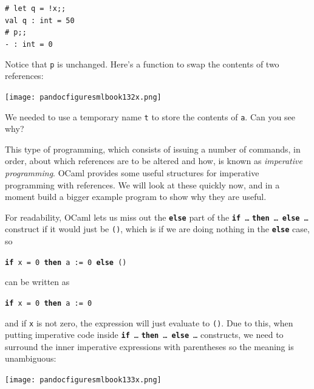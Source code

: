 \documentclass[]{book}
\newcommand{\smspace}{\vspace{4mm}}
\begin{document}
\smspace
\noindent\verb$# let q = !x;;$\\
\noindent\verb!val q : int = 50!\\
\noindent\verb$# p;;$\\
\noindent\verb!- : int = 0!
\smspace

\noindent Notice that \texttt{p} is unchanged. Here's a function to swap the contents of two references:

\medskip
\begin{center}
\noindent\texttt{[image: pandocfiguresmlbook132x.png]}
\end{center}
\medskip

\noindent We needed to use a temporary name \texttt{t} to store the contents of \texttt{a}. Can you see why?

This type of programming, which consists of issuing a number of commands, in order, about which references are to be altered and how, is known as \textit{imperative programming}. OCaml provides some useful structures for imperative programming with references. We will look at these quickly now, and in a moment build a bigger example program to show why they are useful.

For readability, OCaml lets us miss out the \textbf{\texttt{else}} part of the \textbf{\texttt{if}}\ \texttt{\ldots} \textbf{\texttt{then}}\ \texttt{\ldots}\ \textbf{\texttt{else}}\ \texttt{\ldots} construct if it would just be \texttt{()}, which is if we are doing nothing in the \textbf{\texttt{else}} case, so

\smspace
  \textbf{\texttt{if}}\texttt{ x = 0 }\textbf{\texttt{then}}\texttt{ a := 0 }\textbf{\texttt{else}}\texttt{ ()}
\smspace

\noindent can be written as

\smspace
  \textbf{\texttt{if}}\texttt{ x = 0 }\textbf{\texttt{then}}\texttt{ a := 0}
\smspace

\noindent and if \texttt{x} is not zero, the expression will just evaluate to \texttt{()}. Due to this, when putting imperative code inside \textbf{\texttt{if}}\ \texttt{\ldots} \textbf{\texttt{then}}\ \texttt{\ldots}\ \textbf{\texttt{else}}\ \texttt{\ldots}  constructs, we need to surround the inner imperative expressions with parentheses so the meaning is unambiguous:

\medskip
\begin{center}
\noindent\texttt{[image: pandocfiguresmlbook133x.png]}
\end{center}
\medskip
\end{document}
